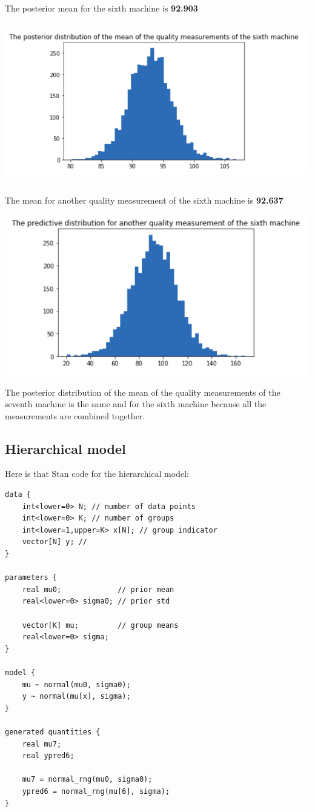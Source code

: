 \documentclass[17pt]{article}
\begin{document}
\newpage
The posterior mean for the sixth machine is \textbf{92.903}\\
\begin{center}
\includegraphics[width=15cm, height=7cm]{mean_pooled.png}
\end{center}

The mean for another quality measurement of the sixth machine is \textbf{92.637}
\begin{center}
\includegraphics[width=15cm, height=7cm]{next_pooled.png}
\end{center}

The posterior distribution of the mean of the quality measurements of the seventh machine is the same and for the sixth machine because all the measurements are combined together.

\subsection{Hierarchical model}
Here is that Stan code for the hierarchical model:
\begin{lstlisting}
data {
    int<lower=0> N; // number of data points
    int<lower=0> K; // number of groups
    int<lower=1,upper=K> x[N]; // group indicator
    vector[N] y; //
}

parameters {
    real mu0;             // prior mean
    real<lower=0> sigma0; // prior std
    
    vector[K] mu;         // group means
    real<lower=0> sigma;
}

model {
    mu ~ normal(mu0, sigma0);
    y ~ normal(mu[x], sigma);
}

generated quantities {
    real mu7;
    real ypred6;
    
    mu7 = normal_rng(mu0, sigma0);
    ypred6 = normal_rng(mu[6], sigma);
}
\end{lstlisting}
\end{document}
